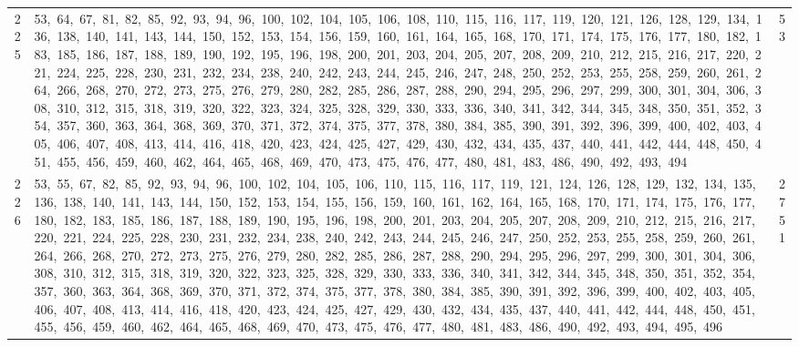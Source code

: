 \begin{longtable}{c|p{}|r}
225 & 53,\ 64,\ 67,\ 81,\ 82,\ 85,\ 92,\ 93,\ 94,\ 96,\ 100,\ 102,\ 104,\ 105,\ 106,\ 108,\ 110,\ 115,\ 116,\ 117,\ 119,\ 120,\ 121,\ 126,\ 128,\ 129,\ 134,\ 136,\ 138,\ 140,\ 141,\ 143,\ 144,\ 150,\ 152,\ 153,\ 154,\ 156,\ 159,\ 160,\ 161,\ 164,\ 165,\ 168,\ 170,\ 171,\ 174,\ 175,\ 176,\ 177,\ 180,\ 182,\ 183,\ 185,\ 186,\ 187,\ 188,\ 189,\ 190,\ 192,\ 195,\ 196,\ 198,\ 200,\ 201,\ 203,\ 204,\ 205,\ 207,\ 208,\ 209,\ 210,\ 212,\ 215,\ 216,\ 217,\ 220,\ 221,\ 224,\ 225,\ 228,\ 230,\ 231,\ 232,\ 234,\ 238,\ 240,\ 242,\ 243,\ 244,\ 245,\ 246,\ 247,\ 248,\ 250,\ 252,\ 253,\ 255,\ 258,\ 259,\ 260,\ 261,\ 264,\ 266,\ 268,\ 270,\ 272,\ 273,\ 275,\ 276,\ 279,\ 280,\ 282,\ 285,\ 286,\ 287,\ 288,\ 290,\ 294,\ 295,\ 296,\ 297,\ 299,\ 300,\ 301,\ 304,\ 306,\ 308,\ 310,\ 312,\ 315,\ 318,\ 319,\ 320,\ 322,\ 323,\ 324,\ 325,\ 328,\ 329,\ 330,\ 333,\ 336,\ 340,\ 341,\ 342,\ 344,\ 345,\ 348,\ 350,\ 351,\ 352,\ 354,\ 357,\ 360,\ 363,\ 364,\ 368,\ 369,\ 370,\ 371,\ 372,\ 374,\ 375,\ 377,\ 378,\ 380,\ 384,\ 385,\ 390,\ 391,\ 392,\ 396,\ 399,\ 400,\ 402,\ 403,\ 405,\ 406,\ 407,\ 408,\ 413,\ 414,\ 416,\ 418,\ 420,\ 423,\ 424,\ 425,\ 427,\ 429,\ 430,\ 432,\ 434,\ 435,\ 437,\ 440,\ 441,\ 442,\ 444,\ 448,\ 450,\ 451,\ 455,\ 456,\ 459,\ 460,\ 462,\ 464,\ 465,\ 468,\ 469,\ 470,\ 473,\ 475,\ 476,\ 477,\ 480,\ 481,\ 483,\ 486,\ 490,\ 492,\ 493,\ 494 & 53 \\
226 & 53,\ 55,\ 67,\ 82,\ 85,\ 92,\ 93,\ 94,\ 96,\ 100,\ 102,\ 104,\ 105,\ 106,\ 110,\ 115,\ 116,\ 117,\ 119,\ 121,\ 124,\ 126,\ 128,\ 129,\ 132,\ 134,\ 135,\ 136,\ 138,\ 140,\ 141,\ 143,\ 144,\ 150,\ 152,\ 153,\ 154,\ 155,\ 156,\ 159,\ 160,\ 161,\ 162,\ 164,\ 165,\ 168,\ 170,\ 171,\ 174,\ 175,\ 176,\ 177,\ 180,\ 182,\ 183,\ 185,\ 186,\ 187,\ 188,\ 189,\ 190,\ 195,\ 196,\ 198,\ 200,\ 201,\ 203,\ 204,\ 205,\ 207,\ 208,\ 209,\ 210,\ 212,\ 215,\ 216,\ 217,\ 220,\ 221,\ 224,\ 225,\ 228,\ 230,\ 231,\ 232,\ 234,\ 238,\ 240,\ 242,\ 243,\ 244,\ 245,\ 246,\ 247,\ 250,\ 252,\ 253,\ 255,\ 258,\ 259,\ 260,\ 261,\ 264,\ 266,\ 268,\ 270,\ 272,\ 273,\ 275,\ 276,\ 279,\ 280,\ 282,\ 285,\ 286,\ 287,\ 288,\ 290,\ 294,\ 295,\ 296,\ 297,\ 299,\ 300,\ 301,\ 304,\ 306,\ 308,\ 310,\ 312,\ 315,\ 318,\ 319,\ 320,\ 322,\ 323,\ 325,\ 328,\ 329,\ 330,\ 333,\ 336,\ 340,\ 341,\ 342,\ 344,\ 345,\ 348,\ 350,\ 351,\ 352,\ 354,\ 357,\ 360,\ 363,\ 364,\ 368,\ 369,\ 370,\ 371,\ 372,\ 374,\ 375,\ 377,\ 378,\ 380,\ 384,\ 385,\ 390,\ 391,\ 392,\ 396,\ 399,\ 400,\ 402,\ 403,\ 405,\ 406,\ 407,\ 408,\ 413,\ 414,\ 416,\ 418,\ 420,\ 423,\ 424,\ 425,\ 427,\ 429,\ 430,\ 432,\ 434,\ 435,\ 437,\ 440,\ 441,\ 442,\ 444,\ 448,\ 450,\ 451,\ 455,\ 456,\ 459,\ 460,\ 462,\ 464,\ 465,\ 468,\ 469,\ 470,\ 473,\ 475,\ 476,\ 477,\ 480,\ 481,\ 483,\ 486,\ 490,\ 492,\ 493,\ 494,\ 495,\ 496 & 2751 \\

\end{longtable}

